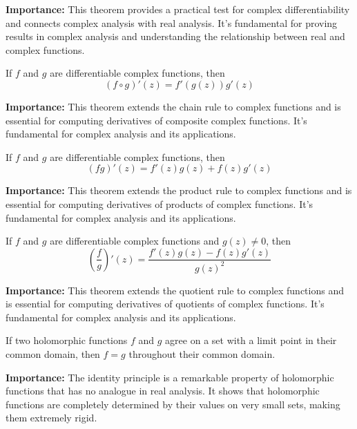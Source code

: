 \noindent\textbf{Importance:} This theorem provides a practical test for complex differentiability and connects complex analysis with real analysis. It's fundamental for proving results in complex analysis and understanding the relationship between real and complex functions.



\begin{theorem}
If $f$ and $g$ are differentiable complex functions, then
\[ (f \circ g)'(z) = f'(g(z))g'(z) \]
\end{theorem}

\noindent\textbf{Importance:} This theorem extends the chain rule to complex functions and is essential for computing derivatives of composite complex functions. It's fundamental for complex analysis and its applications.



\begin{theorem}
If $f$ and $g$ are differentiable complex functions, then
\[ (fg)'(z) = f'(z)g(z) + f(z)g'(z) \]
\end{theorem}

\noindent\textbf{Importance:} This theorem extends the product rule to complex functions and is essential for computing derivatives of products of complex functions. It's fundamental for complex analysis and its applications.



\begin{theorem}
If $f$ and $g$ are differentiable complex functions and $g(z) \neq 0$, then
\[ \left(\frac{f}{g}\right)'(z) = \frac{f'(z)g(z) - f(z)g'(z)}{g(z)^2} \]
\end{theorem}

\noindent\textbf{Importance:} This theorem extends the quotient rule to complex functions and is essential for computing derivatives of quotients of complex functions. It's fundamental for complex analysis and its applications.



\begin{theorem}
If two holomorphic functions $f$ and $g$ agree on a set with a limit point in their common domain, then $f = g$ throughout their common domain.
\end{theorem}

\noindent\textbf{Importance:} The identity principle is a remarkable property of holomorphic functions that has no analogue in real analysis. It shows that holomorphic functions are completely determined by their values on very small sets, making them extremely rigid.



